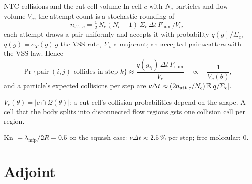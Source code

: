 \begin{frame}{NTC collisions and the cut-cell volume}
In cell $c$ with $N_c$ particles and flow volume $V_c$, the attempt count is a stochastic
rounding of
\[
\bar n_{\mathrm{att},c} = \tfrac12\,N_c(N_c-1)\,\Sigma_c\,\Delta t\,F_{\mathrm{num}}/V_c ,
\]
each attempt draws a pair uniformly and accepts it with probability $q(g)/\Sigma_c$,
$q(g) = \sigma_T(g)\,g$ the VSS rate, $\Sigma_c$ a majorant; an accepted pair scatters
with the VSS law.  Hence
\[
\Pr\{\text{pair } (i,j) \text{ collides in step } k\} \approx \frac{q(g_{ij})\,\Delta t\,F_{\mathrm{num}}}{V_c}
\quad\propto\quad \frac{1}{V_c(\theta)},
\]
and a particle's expected collisions per step are
$\nu\Delta t \approx (2\bar n_{\mathrm{att},c}/N_c)\,\mathbb{E}[q/\Sigma_c]$.

\medskip
$V_c(\theta) = |c\cap\Omega(\theta)|$: a cut cell's collision probabilities depend on the shape.
A cell that the body splits into disconnected flow regions gets one collision cell per region.

\medskip
Kn $= \lambda_{\mathrm{mfp}}/2R = 0.5$ on the squash case: $\nu\Delta t\approx 2.5\,\%$ per step; free-molecular: $0$.
\end{frame}

\section{Adjoint}

